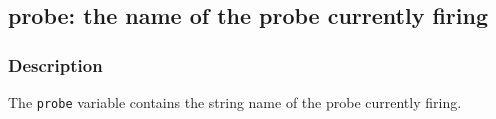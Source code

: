 \clearpage
{}
{}
\label{varsprobe}
\subsection*{probe: the name of the probe currently firing}

\subsubsection*{Description}

The \verb|probe| variable contains the string name of the probe
currently firing.

